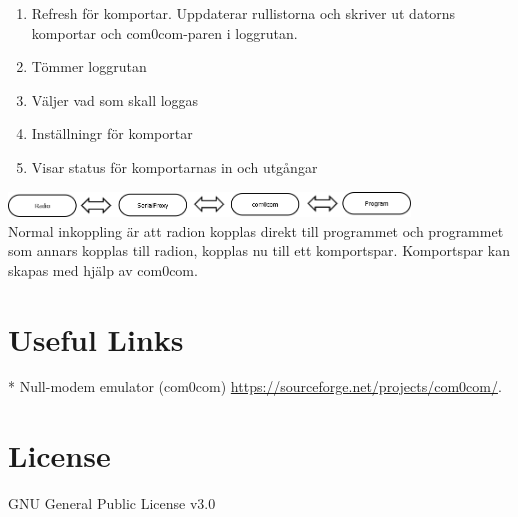 \documentclass[a4paper]{article}
\begin{document}
\begin{enumerate}   
\item Refresh för komportar. Uppdaterar rullistorna och skriver ut datorns komportar och com0com-paren i loggrutan. 
\item Tömmer loggrutan
\item Väljer vad som skall loggas
\item Inställningr för komportar
\item Visar status för komportarnas in och utgångar
\end{enumerate}  

\vspace*{50px}
\includegraphics[width=0.8\textwidth]{../image/Diagram1.png}\\[1cm] 
Normal inkoppling är att radion kopplas direkt till programmet och programmet som annars kopplas till radion, kopplas nu till ett komportspar.
\newline
Komportspar kan skapas med hjälp av com0com.


\newpage

\section*{Useful Links}

* Null-modem emulator (com0com) \href{https://sourceforge.net/projects/com0com/}{https://sourceforge.net/projects/com0com/}. 

\section*{License}

GNU General Public License v3.0
\end{document}
